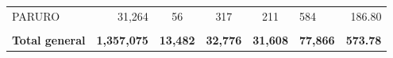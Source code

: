 \begin{tabular}{lrccclr}
	\cellcolor[HTML]{C6E0B4}PARURO                                 & 31,264                                                         & 56                                                          & 317                  & 211                      & 584                                                                 & 186.80                                                                       \\
	& \multicolumn{1}{l}{}                                           & \multicolumn{1}{l}{}                                        & \multicolumn{1}{l}{} & \multicolumn{1}{l}{}     &                                                                     & \multicolumn{1}{l}{}                                                         \\
	\rowcolor[HTML]{DDEBF7} 
	\textbf{Total   general}                                       & \textbf{1,357,075}                                             & \multicolumn{1}{r}{\cellcolor[HTML]{DDEBF7}\textbf{13,482}} & \textbf{32,776}      & \textbf{31,608}          & \textbf{77,866}                                                     & \textbf{573.78}                                                             
\end{tabular}